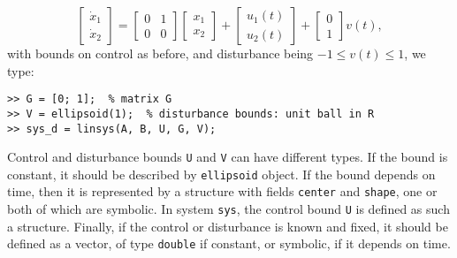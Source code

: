 \[ \left[\begin{array}{cc}
\dot{x}_1\\
\dot{x}_2\end{array}\right] = \left[\begin{array}{cc}
0 & 1\\
0 & 0\end{array}\right]\left[\begin{array}{c}
x_1\\
x_2\end{array}\right] + \left[\begin{array}{c}
u_1(t)\\
u_2(t)\end{array}\right] + \left[\begin{array}{c}
0\\
1\end{array}\right]v(t), \]
with bounds on control as before, and disturbance being $-1\leq v(t)\leq1$,
we type:
{\tt \begin{verbatim}
>> G = [0; 1];  % matrix G
>> V = ellipsoid(1);  % disturbance bounds: unit ball in R
>> sys_d = linsys(A, B, U, G, V);
\end{verbatim} }
Control and disturbance bounds {\tt U} and {\tt V} can have different types.
If the bound is constant, it should be described by {\tt ellipsoid} object.
If the bound depends on time, then it is represented by a structure with
fields {\tt center} and {\tt shape}, one or both of which are symbolic.
In system {\tt sys}, the control bound {\tt U} is defined as such a structure.
Finally, if the control or disturbance is known and fixed, it should be
defined as a vector, of type {\tt double} if constant, or symbolic, if
it depends on time.

